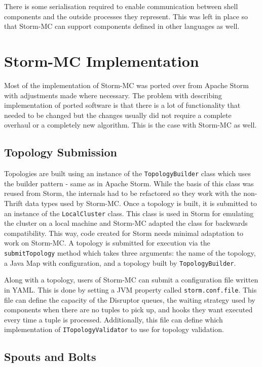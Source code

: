 \documentclass[bsc,deptreport,twoside,singlespacing,normalheadings,parskip]{infthesis}\usepackage[]{graphicx}\usepackage[]{color}
\begin{document}
There is some serialisation required to enable communication between shell components and the outside processes they represent. This was left in place so that Storm-MC can support components defined in other languages as well.

\section{Storm-MC Implementation}
\label{sec:implementation}

Most of the implementation of Storm-MC was ported over from Apache Storm with adjustments made where necessary. The problem with describing implementation of ported software is that there is a lot of functionality that needed to be changed but the changes usually did not require a complete overhaul or a completely new algorithm. This is the case with Storm-MC as well.

\subsection{Topology Submission}

Topologies are built using an instance of the \texttt{TopologyBuilder} class which uses the builder pattern - same as in Apache Storm. While the basis  of this class was reused from Storm, the internals had to be refactored so they work with the non-Thrift data types used by Storm-MC. Once a topology is built, it is submitted to an instance of the \texttt{LocalCluster} class. This class is used in Storm for emulating the cluster on a local machine and Storm-MC adapted the class for backwards compatibility. This way, code created for Storm needs minimal adaptation to work on Storm-MC. A topology is submitted for execution via the \texttt{submitTopology} method which takes three arguments: the name of the topology, a Java Map with configuration, and a topology built by \texttt{TopologyBuilder}.

Along with a topology, users of Storm-MC can submit a configuration file written in YAML. This is done by setting a JVM property called \texttt{storm.conf.file}. This file can define the capacity of the Disruptor queues, the waiting strategy used by components when there are no tuples to pick up, and hooks they want executed every time a tuple is processed. Additionally, this file can define which implementation of \texttt{ITopologyValidator} to use for topology validation.

\subsection{Spouts and Bolts}
\end{document}
